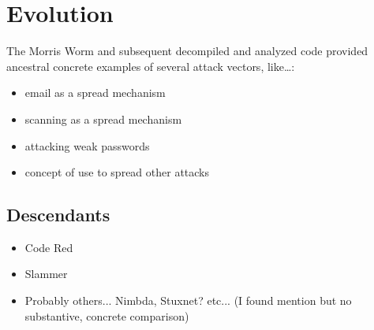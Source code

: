 \section*{Evolution}

The Morris Worm and subsequent decompiled and analyzed code provided
ancestral concrete examples of several attack vectors, like\ldots :
   		\begin{itemize}
   		\item email as a spread mechanism
   		\item scanning as a spread mechanism
        \item attacking weak passwords
        \item concept of use to spread other attacks  
   		\end{itemize} 

\subsection*{Descendants}
		\begin{itemize}
        \item Code Red
        \item Slammer
        \item Probably others... Nimbda, Stuxnet? etc... (I found mention but no substantive, concrete comparison)
		\end{itemize}
		
